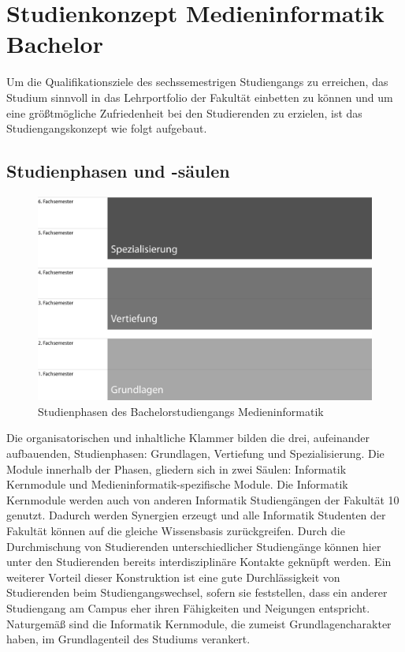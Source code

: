 \section{Studienkonzept Medieninformatik
Bachelor}\label{studienkonzept-medieninformatik-bachelor}

Um die Qualifikationsziele des sechssemestrigen Studiengangs zu
erreichen, das Studium sinnvoll in das Lehrportfolio der Fakultät
einbetten zu können und um eine größtmögliche Zufriedenheit bei den
Studierenden zu erzielen, ist das Studiengangskonzept wie folgt
aufgebaut.

\subsection{Studienphasen und
-säulen}\label{studienphasen-und--suxe4ulen}

\begin{figure}[htbp]
\centering
\includegraphics[width=\columnwidth]{../anhaenge/bilder/ba-studienphasen.png}
\caption{Studienphasen des Bachelorstudiengangs Medieninformatik}
\end{figure}

Die organisatorischen und inhaltliche Klammer bilden die drei,
aufeinander aufbauenden, Studienphasen: Grundlagen, Vertiefung und
Spezialisierung. Die Module innerhalb der Phasen, gliedern sich in zwei
Säulen: Informatik Kernmodule und Medieninformatik-spezifische Module.
Die Informatik Kernmodule werden auch von anderen Informatik
Studiengängen der Fakultät 10 genutzt. Dadurch werden Synergien erzeugt
und alle Informatik Studenten der Fakultät können auf die gleiche
Wissensbasis zurückgreifen. Durch die Durchmischung von Studierenden
unterschiedlicher Studiengänge können hier unter den Studierenden
bereits interdisziplinäre Kontakte geknüpft werden. Ein weiterer Vorteil
dieser Konstruktion ist eine gute Durchlässigkeit von Studierenden beim
Studiengangswechsel, sofern sie feststellen, dass ein anderer
Studiengang am Campus eher ihren Fähigkeiten und Neigungen entspricht.
Naturgemäß sind die Informatik Kernmodule, die zumeist
Grundlagencharakter haben, im Grundlagenteil des Studiums verankert.

